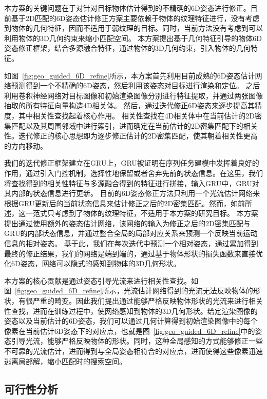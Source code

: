 \documentclass[12pt]{article}
\begin{document}
本方案的关键问题在于对针对目标物体估计得到的不精确的6D姿态进行修正。目前基于2D匹配的6D姿态估计修正方案主要依赖于物体的纹理特征进行，没有考虑到物体的几何特征，因而不适用于弱纹理的目标。同时，当前方法没有考虑到可以利用物体的3D几何约束来缩小匹配空间。
本方案提出基于几何特征引导的物体6D姿态修正框架，结合多源融合特征，通过物体的3D几何约束，引入物体的几何特征。

如图~\ref{fig:geo_guided_6D_refine}所示，本方案首先利用目前成熟的6D姿态估计网络预测得到一个不精确的6D姿态，然后利用该姿态对目标进行渲染和定位。
之后利用卷积神经网络对目标图像和初始渲染图像分别进行特征提取，并通过两张图像抽取的所有特征向量构造4D相关体。
然后，通过迭代修正6D姿态来逐步提高其精度，其中相关性查找起着核心作用。
相关性查找在4D相关体中在当前估计的2D密集匹配以及其周围邻域中进行索引，进而确定在当前估计的2D密集匹配下的相关性。迭代修正的核心思想即为逐步修正估计的2D密集匹配，使其朝着相关性更高的方向移动。

我们的迭代修正框架建立在GRU上，GRU被证明在序列任务建模中发挥着良好的作用，通过引入门控机制，选择性地保留或者舍弃先前的状态信息。在这里，我们将查找得到的相关性特征与多源融合得到的特征进行拼接，输入GRU中，GRU对其内部的状态信息进行更新。
目前的6D姿态修正方法只利用一个光流估计网络来根据GRU更新后的当前状态信息来估计修正之后的2D密集匹配。然而，如前所述，这一范式只考虑到了物体的纹理特征，不适用于本方案的研究目标。
本方案提出通过使用额外的姿态估计网络，该网络的输入为修正之后的2D密集匹配与GRU的内部状态信息，并通过整合全局的局部对应关系来预测一个反映当前运动信息的相对姿态。
基于此，我们在每次迭代中预测一个相对姿态，通过累加得到最终的修正结果，我们的网络是端到端的，通过基于物体形状的损失函数来直接优化6D姿态，网络可以隐式的感知到物体的3D几何形状。


本方案的核心贡献是通过姿态引导光流来进行相关性查找。如图~\ref{fig:geo_guided_6D_refine}所示，光流估计网络得到的光流无法反映物体的形状，有很严重的畸变。因此我们提出通过能够严格反映物体形状的光流来进行相关性查找，进而在训练过程中，使网络感知到物体的3D几何形状。给定渲染图像的姿态以及当前估计的6D姿态，我们可以通过几何计算得到初始渲染图像中的每个像素在当前估计6D姿态下的对应点，也就是图~\ref{fig:geo_guided_6D_refine}中的姿态引导光流，能够严格反映物体的形状。同时，这种全局感知的方式能够修正一些不可靠的光流估计，进而得到与全局姿态相符合的对应点，进而使得这些像素迅速逃离局部解，缩小匹配时的搜索空间。

\subsection{可行性分析}
\end{document}
